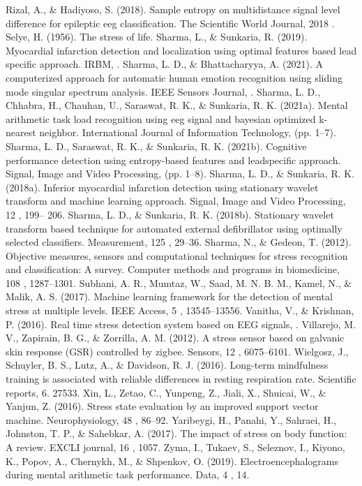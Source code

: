 Rizal, A., \& Hadiyoso, S. (2018). Sample entropy on multidistance signal level difference for epileptic eeg classification. The Scientific World Journal, 2018 .
Selye, H. (1956). The stress of life.
Sharma, L., \& Sunkaria, R. (2019). Myocardial infarction detection and localization using optimal features based lead specific approach. IRBM, .
Sharma, L. D., \& Bhattacharyya, A. (2021). A computerized approach for automatic human emotion recognition using sliding mode singular spectrum analysis. IEEE Sensors Journal, .
Sharma, L. D., Chhabra, H., Chauhan, U., Saraswat, R. K., \& Sunkaria, R. K. (2021a). Mental arithmetic task load recognition using eeg signal and bayesian optimized k-nearest neighbor. International Journal of Information Technology, (pp. 1–7).
Sharma, L. D., Saraswat, R. K., \& Sunkaria, R. K. (2021b). Cognitive performance detection using entropy-based features and leadspecific approach. Signal, Image and Video Processing, (pp. 1–8).
Sharma, L. D., \& Sunkaria, R. K. (2018a). Inferior myocardial infarction detection using stationary wavelet transform and machine learning approach. Signal, Image and Video Processing, 12 , 199– 206.
Sharma, L. D., \& Sunkaria, R. K. (2018b). Stationary wavelet transform based technique for automated external defibrillator using optimally selected classifiers. Measurement, 125 , 29–36.
Sharma, N., \& Gedeon, T. (2012). Objective measures, sensors and computational techniques for stress recognition and classification: A survey. Computer methods and programs in biomedicine, 108 , 1287–1301.
Subhani, A. R., Mumtaz, W., Saad, M. N. B. M., Kamel, N., \& Malik, A. S. (2017). Machine learning framework for the detection of mental stress at multiple levels. IEEE Access, 5 , 13545–13556.
Vanitha, V., \& Krishnan, P. (2016). Real time stress detection system based on EEG signals, .
Villarejo, M. V., Zapirain, B. G., \& Zorrilla, A. M. (2012). A stress sensor based on galvanic skin response (GSR) controlled by zigbee. Sensors, 12 , 6075–6101.
Wielgosz, J., Schuyler, B. S., Lutz, A., \& Davidson, R. J. (2016). Long-term mindfulness training is associated with reliable differences in resting respiration rate. Scientific reports, $\mathit{6.}$ 27533.
Xin, L., Zetao, C., Yunpeng, Z., Jiali, X., Shuicai, W., \& Yanjun, Z. (2016). Stress state evaluation by an improved support vector machine. Neurophysiology, 48 , 86–92.
Yaribeygi, H., Panahi, Y., Sahraei, H., Johnston, T. P., \& Sahebkar, A. (2017). The impact of stress on body function: A review. EXCLI journal, 16 , 1057.
Zyma, I., Tukaev, S., Seleznov, I., Kiyono, K., Popov, A., Chernykh, M., \& Shpenkov, O. (2019). Electroencephalograms during mental arithmetic task performance. Data, 4 , 14.

